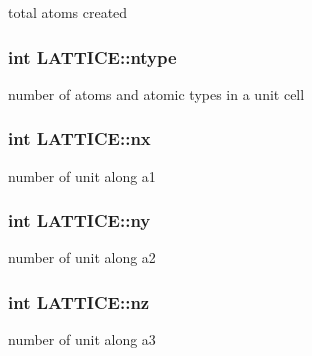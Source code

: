 total atoms created 

\hypertarget{class_l_a_t_t_i_c_e_a552cdb99c1b6cc2bd8bdd723e9f141ab}{}
\subsubsection[{ntype}]{\setlength{\rightskip}{0pt plus 5cm}int L\+A\+T\+T\+I\+C\+E\+::ntype}\label{class_l_a_t_t_i_c_e_a552cdb99c1b6cc2bd8bdd723e9f141ab}


number of atoms and atomic types in a unit cell 

\hypertarget{class_l_a_t_t_i_c_e_a64884f89e993db7a215153bf5f56987b}{}
\subsubsection[{nx}]{\setlength{\rightskip}{0pt plus 5cm}int L\+A\+T\+T\+I\+C\+E\+::nx}\label{class_l_a_t_t_i_c_e_a64884f89e993db7a215153bf5f56987b}


number of unit along a1 

\hypertarget{class_l_a_t_t_i_c_e_aa202fceba51fcd040afafd1a02e2860e}{}
\subsubsection[{ny}]{\setlength{\rightskip}{0pt plus 5cm}int L\+A\+T\+T\+I\+C\+E\+::ny}\label{class_l_a_t_t_i_c_e_aa202fceba51fcd040afafd1a02e2860e}


number of unit along a2 

\hypertarget{class_l_a_t_t_i_c_e_ad32ea9361884a2bbcb81714ebe1bc15c}{}
\subsubsection[{nz}]{\setlength{\rightskip}{0pt plus 5cm}int L\+A\+T\+T\+I\+C\+E\+::nz}\label{class_l_a_t_t_i_c_e_ad32ea9361884a2bbcb81714ebe1bc15c}


number of unit along a3 

\hypertarget{class_l_a_t_t_i_c_e_a3737ca172950824ad0ab699802f26417}{}
